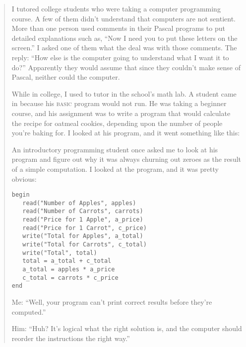\begin{quote}
{
 I tutored college students who were taking a computer programming
course. A few of them didn't understand that computers
are not sentient. More than one person used comments in their Pascal
programs to put detailed explanations such as, ``Now I
need you to put these letters on the screen.'' I
asked one of them what the deal was with those comments. The reply:
``How else is the computer going to understand what I
want it to do?'' Apparently they would assume that
since they couldn't make sense of Pascal, neither could
the computer.}

{
 While in college, I used to tutor in the school's
math lab. A student came in because his \textsc{basic} program would not run. He
was taking a beginner course, and his assignment was to write a program
that would calculate the recipe for oatmeal cookies, depending upon the
number of people you're baking for. I looked at his
program, and it went something like this:}


{
 An introductory programming student once asked me to look at his
program and figure out why it was always churning out zeroes as the
result of a simple computation. I looked at the program, and it was
pretty obvious:}

\begin{verbatim}
begin
   read("Number of Apples", apples)
   read("Number of Carrots", carrots)
   read("Price for 1 Apple", a_price)
   read("Price for 1 Carrot", c_price)
   write("Total for Apples", a_total)
   write("Total for Carrots", c_total)
   write("Total", total)
   total = a_total + c_total
   a_total = apples * a_price
   c_total = carrots * c_price
end
\end{verbatim}

{
 Me: ``Well, your program can't
print correct results before they're
computed.''}

{
 Him: ``Huh? It's logical what the
right solution is, and the computer should reorder the instructions the
right way.''}
\end{quote}


